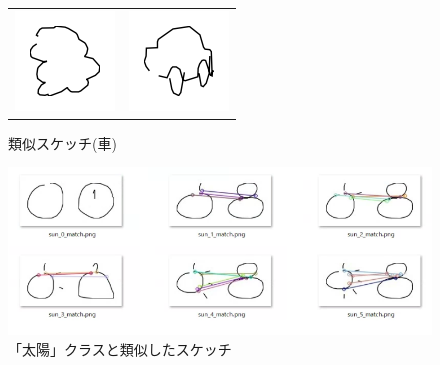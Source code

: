 \documentclass[onecolumn]{ujarticle}   %
\begin{document}
\begin{figure}[htbp]
    \begin{tabular}{cc}
      \begin{minipage}[t]{0.45\hsize}
        \centering
        \includegraphics[keepaspectratio, scale=1]{sheep_0_best.png}
        \caption{最尤部分スケッチ}
        \label{fig:result2_1}
      \end{minipage} &
      \begin{minipage}[t]{0.45\hsize}
        \centering
        \includegraphics[keepaspectratio, scale=1]{sheep_car_sim.png}
        \caption{類似スケッチ(車)}
        \label{fig:result2_2}
      \end{minipage} \\

    \end{tabular}
  \end{figure}


  \begin{figure}[th]
    \begin{center}
      \includegraphics[clip,width=140mm]{sun.png}
      \caption{「太陽」クラスと類似したスケッチ}
      \label{fig:result1_2}
    \end{center}
  \end{figure}
\end{document}
